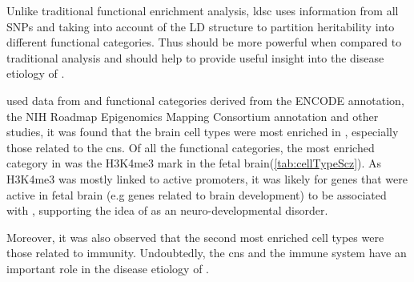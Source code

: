 \documentclass[12pt]{book}
\newcommand*{\glng}{\glsentrylong}
\begin{document}
	Unlike traditional functional enrichment analysis, \gls{ldsc} uses information from all \glspl{SNP} and taking into account of the \gls{LD} structure to partition heritability into different functional categories. 
	Thus should be more powerful when compared to traditional analysis and should help to provide useful insight into the disease etiology of \glng{scz}.

	\citet{Finucane2015} used data from \citet{Ripke2014} and functional categories derived from the ENCODE annotation\citep{ENCODEProjectConsortium2012}, the NIH Roadmap Epigenomics Mapping Consortium annotation\citep{Bernstein2010} and other studies\citep{Finucane2015}, it was found that the brain cell types were most enriched in \glng{scz}, especially those related to the \gls{cns}.
	Of all the functional categories, the most enriched category in \glng{scz} was the H3K4me3 mark in the fetal brain(\cref{tab:cellTypeScz}). 
	As H3K4me3 was mostly linked to active promoters, it was likely for genes that were active in fetal brain (e.g genes related to brain development) to be associated with \glng{scz}, supporting the idea of \glng{scz} as an neuro-developmental disorder. 
	
	Moreover, it was also observed that the second most enriched cell types were those related to immunity.
	Undoubtedly, the \gls{cns} and the immune system have an important role in the disease etiology of \glng{scz}. 
\end{document}
